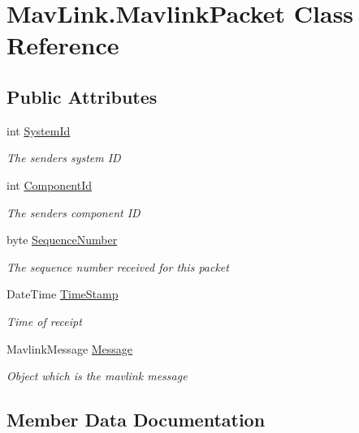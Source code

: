 \hypertarget{classMavLink_1_1MavlinkPacket}{}\section{Mav\+Link.\+Mavlink\+Packet Class Reference}
\label{classMavLink_1_1MavlinkPacket}
\subsection*{Public Attributes}
\begin{DoxyCompactItemize}
\item 
int \hyperlink{classMavLink_1_1MavlinkPacket_ae10478e1f7182b45c452c7ce8cb14016}{System\+Id}
\begin{DoxyCompactList}\small\item\em The sender\textquotesingle{}s system ID \end{DoxyCompactList}\item 
int \hyperlink{classMavLink_1_1MavlinkPacket_a757b10451bbb36de712e50898097ce76}{Component\+Id}
\begin{DoxyCompactList}\small\item\em The sender\textquotesingle{}s component ID \end{DoxyCompactList}\item 
byte \hyperlink{classMavLink_1_1MavlinkPacket_a02bc9d9153a2b3df8e343488c78bfe9d}{Sequence\+Number}
\begin{DoxyCompactList}\small\item\em The sequence number received for this packet \end{DoxyCompactList}\item 
Date\+Time \hyperlink{classMavLink_1_1MavlinkPacket_a41ba9c38f178fadebcc0efebe42a94a2}{Time\+Stamp}
\begin{DoxyCompactList}\small\item\em Time of receipt \end{DoxyCompactList}\item 
Mavlink\+Message \hyperlink{classMavLink_1_1MavlinkPacket_addf815b76e6685627f91584450130035}{Message}
\begin{DoxyCompactList}\small\item\em Object which is the mavlink message \end{DoxyCompactList}\end{DoxyCompactItemize}


\subsection{Member Data Documentation}
\mbox{\label{classMavLink_1_1MavlinkPacket_a757b10451bbb36de712e50898097ce76}} 
